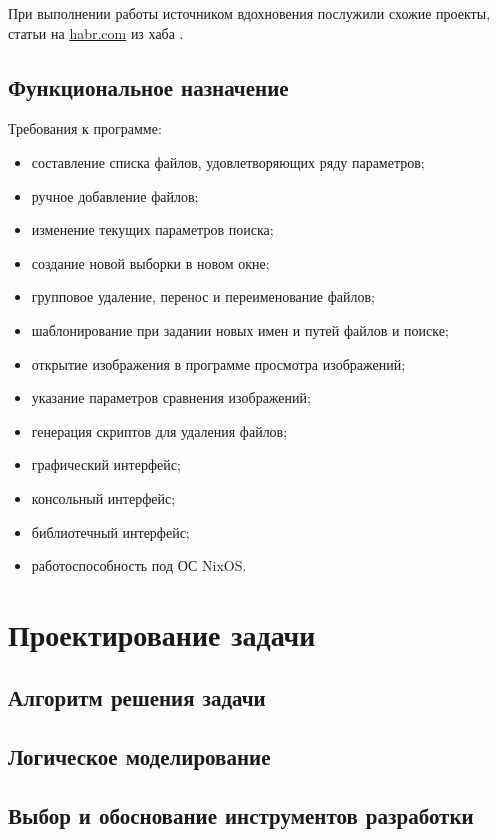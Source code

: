 \documentclass[variant=courcework]{bsuir}
\begin{document}
При выполнении работы источником вдохновения послужили схожие проекты, статьи на
\href{https://habr.com/}{habr.com} из хаба .

\section{Функциональное назначение}

Требования к программе:

\begin{itemize}
    \item составление списка файлов, удовлетворяющих ряду параметров;
    \item ручное добавление файлов;
    \item изменение текущих параметров поиска;
    \item создание новой выборки в новом окне;
    \item групповое удаление, перенос и переименование файлов;
    \item шаблонирование при задании новых имен и путей файлов и поиске;
    \item открытие изображения в программе просмотра изображений;
    \item указание параметров сравнения изображений;
    \item генерация скриптов для удаления файлов;
    \item графический интерфейс;
    \item консольный интерфейс;
    \item библиотечный интерфейс;
    \item работоспособность под ОС NixOS.
\end{itemize}

\chapter{Проектирование задачи}
\section{Алгоритм решения задачи}
\label{sec:2.1}



\section{Логическое моделирование}



\section{Выбор и обоснование инструментов разработки}
\end{document}
